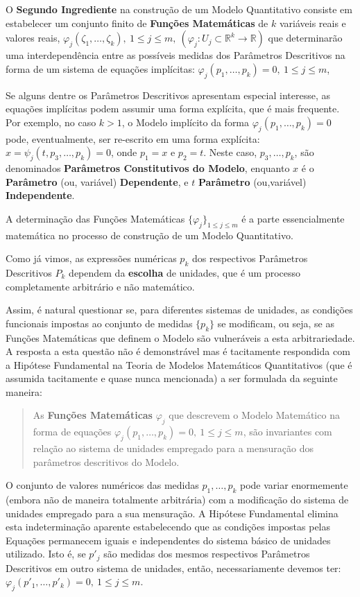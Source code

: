     O \textbf{Segundo Ingrediente} na construção de um Modelo Quantitativo consiste em estabelecer um conjunto finito de \textbf{Funções Matemáticas} de \(k\) variáveis reais e valores reais, \(\varphi_j(\zeta_1, \ldots, \zeta_k),\ 1 \le j \le m,\ (\varphi_j: U_j \subset \mathbb{R}^k \to \mathbb{R})\) que determinarão uma interdependência entre as possíveis medidas dos Parâmetros Descritivos na forma de um sistema de equações implícitas: \(\varphi_j(p_1, \ldots, p_k) = 0,\ 1 \le j \le m\),

    Se alguns dentre os Parâmetros Descritivos apresentam especial interesse, as equações implícitas podem assumir uma forma explícita, que é mais frequente. Por exemplo, no caso \(k > 1\), o Modelo implícito da forma \(\varphi_j(p_1, \ldots, p_k) = 0\) pode, eventualmente, ser re-escrito em uma forma explícita: \(x = \psi_j(t, p_3, \ldots, p_k) = 0\), onde \(p_1 = x\) e \(p_2 = t\). Neste caso, \(p_3, \ldots, p_k\), são denominados \textbf{Parâmetros Constitutivos do Modelo}, enquanto \(x\) é o \textbf{Parâmetro} (ou, variável) \textbf{Dependente}, e \(t\) \textbf{Parâmetro} (ou,variável) \textbf{Independente}.

    A determinação das Funções Matemáticas \(\{\varphi_j\}_{1 \le j \le m}\) é a parte essencialmente matemática no processo de construção de um Modelo Quantitativo.

    Como já vimos, as expressões numéricas \(p_k\) dos respectivos Parâmetros Descritivos \(P_k\) dependem da \textbf{escolha} de unidades, que é um processo completamente arbitrário e não matemático.

    Assim, é natural questionar se, para diferentes sistemas de unidades, as condições funcionais impostas ao conjunto de medidas \(\{p_k\}\) se modificam, ou seja, se as Funções Matemáticas que definem o Modelo são vulneráveis a esta arbitrariedade. A resposta a esta questão não é demonstrável mas é tacitamente respondida com a Hipótese Fundamental na Teoria de Modelos Matemáticos Quantitativos (que é assumida tacitamente e quase nunca mencionada) a ser formulada da seguinte maneira:
    \begin{quotation}
    As \textbf{Funções Matemáticas} \(\varphi_j\) que descrevem o Modelo Matemático na forma de equações \(\varphi_j(p_1, \ldots, p_k) = 0,\ 1 \le j \le m\), são invariantes com relação ao sistema de unidades empregado para a mensuração dos parâmetros descritivos do Modelo.
    \end{quotation}

    O conjunto de valores numéricos das medidas \(p_1, \ldots, p_k\) pode variar enormemente (embora não de maneira totalmente arbitrária) com a modificação do sistema de unidades empregado para a sua mensuração. A Hipótese Fundamental elimina esta indeterminação aparente estabelecendo que as condições impostas pelas Equações permanecem iguais e independentes do sistema básico de unidades utilizado. Isto é, se \(p'_j\) são medidas dos mesmos respectivos Parâmetros Descritivos em outro sistema de unidades, então, necessariamente devemos ter: \(\varphi_j(p'_1, \ldots, p'_k) = 0,\ 1 \le j \le m\).

